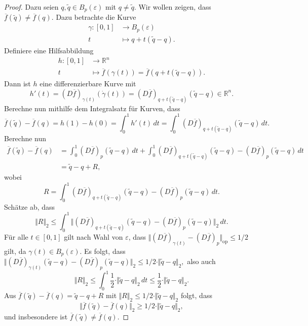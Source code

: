 \documentclass[../main.tex]{subfiles}
\begin{document}
\begin{proof}
  Dazu seien $q, \widetilde q \in B_{p}(\varepsilon)$ 
  mit $q \neq \widetilde q$.
  Wir wollen zeigen, dass $ \overline f(\widetilde q) \neq  \overline f(q)$.
  Dazu betrachte die Kurve
  \begin{align*}
    \gamma \colon [0, 1] & \to B_p(\varepsilon) \\
    t & \mapsto q + t(\widetilde q - q).
  \end{align*}
  Definiere eine Hilfsabbildung
  \begin{align*}
    h \colon [0, 1] & \to \mathbb{R}^n \\
    t & \mapsto \overline f (\gamma(t)) = \overline f(q + t(\widetilde q - q)).
  \end{align*}
  Dann ist $h$ eine differenzierbare Kurve mit
  \[
    h'(t) = {(D\overline f)}_{\gamma(t)}(\dot \gamma(t))
    = {(D \overline f)}_{q + t(\widetilde q - q)}( \widetilde q - q) \in \mathbb{R}^n.
  \]
  Berechne nun mithilfe dem Integralsatz
  für Kurven, dass
  \[
      \overline f(\widetilde q) -  \overline f(q) 
     = h(1) - h(0) 
     =\int_{0}^{1} h'(t) \, dt
    = \int_{0}^{1} {(D \overline f)}_{q + t(\widetilde q - q)}(\widetilde q - q) \, dt.
  \]
  Berechne nun
  \begin{align*}
    \overline f(\widetilde q) - \overline f(q)
    & = \int_{0}^{1} {(D \overline f)}_p (\widetilde q - q) \, dt
    + \int_{0}^{1} {(D \overline f)}_{q + t(\widetilde q - q)}
    (\widetilde q - q) - {(D \overline f)}_p (\widetilde q - q)\, dt\\
    &= \widetilde q - q + R,
  \end{align*}
  wobei
  \[
    R = \int_{0}^{1} {(D \overline f)}_{q + t(\widetilde q - q)}
     (\widetilde q - q) - {(D \overline f)}_p (\widetilde q - q)\, dt.
  \]
  Schätze ab, dass
  \[
    \Vert R \Vert_2
    \leq \int_{0}^{1} \Vert {(D \overline f)}_{q + t(\widetilde q - q)}
    (\widetilde q - q) - {(D \overline f)}_p (\widetilde q - q)\Vert_2 \, dt.
  \]
  Für alle $t \in [0, 1]$ gilt nach Wahl von $\varepsilon$,
  dass
  \(
    \Vert {(D \overline f)}_{\gamma (t)} - {(D \overline f)}_p \Vert_{\text{op}} \leq 1/2
  \)
  gilt, da $\gamma(t) \in B_p(\varepsilon)$.
  Es folgt, dass
  \(
    \Vert {(D \overline f)}_{\gamma(t)}
    (\widetilde q - q) - {(D \overline f)}_p (\widetilde q - q)\Vert_2 
    \leq 1/2 \cdot \Vert \widetilde q - q \Vert_2,
  \)
  also auch
  \[
    \Vert R \Vert_2 \leq \int_{0}^{1} \frac{1}{2} \cdot
    \Vert \widetilde q - q \Vert_2 \, dt
    \leq \frac{1}{2} \cdot \Vert \widetilde q - q \Vert_2.
  \]
  Aus $\overline f (\widetilde q ) - \overline f(q) = \widetilde q - q + R$ 
  mit $\Vert R \Vert_2 \leq 1/2 \cdot \Vert \widetilde q - q \Vert_2$
  folgt, dass
   \[
     \Vert \overline f (\widetilde q ) - \overline f(q) \Vert_2 \geq
     1/2 \cdot \Vert \widetilde q - q \Vert_2,
  \]
  und insbesondere ist $\overline f (\widetilde q ) \neq \overline f ( q)$.
\end{proof}
\end{document}

